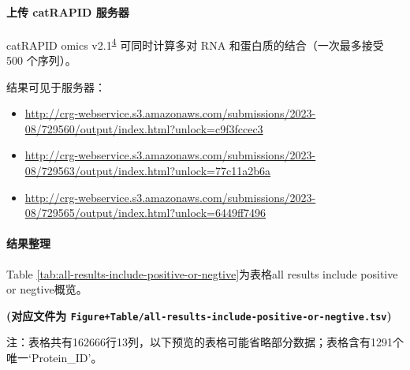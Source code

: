 \documentclass[
]{article}
\providecommand{\tightlist}{%
  \setlength{\itemsep}{0pt}\setlength{\parskip}{0pt}}
\begin{document}
\hypertarget{ux4e0aux4f20-catrapid-ux670dux52a1ux5668}{%
\paragraph{上传 catRAPID 服务器}\label{ux4e0aux4f20-catrapid-ux670dux52a1ux5668}}

catRAPID omics v2.1\textsuperscript{\protect\hyperlink{ref-ICatIRapidArmaos2021}{4}} 可同时计算多对 RNA 和蛋白质的结合（一次最多接受 500 个序列）。

结果可见于服务器：

\begin{itemize}
\tightlist
\item
  \url{http://crg-webservice.s3.amazonaws.com/submissions/2023-08/729560/output/index.html?unlock=c9f3fccec3}
\item
  \url{http://crg-webservice.s3.amazonaws.com/submissions/2023-08/729563/output/index.html?unlock=77c11a2b6a}
\item
  \url{http://crg-webservice.s3.amazonaws.com/submissions/2023-08/729565/output/index.html?unlock=6449ff7496}
\end{itemize}

\hypertarget{ux7ed3ux679cux6574ux7406}{%
\paragraph{结果整理}\label{ux7ed3ux679cux6574ux7406}}

Table \ref{tab:all-results-include-positive-or-negtive}为表格all results include positive or negtive概览。

\textbf{(对应文件为 \texttt{Figure+Table/all-results-include-positive-or-negtive.tsv})}

\begin{center}\begin{tcolorbox}[colback=gray!10, colframe=gray!50, width=0.9\linewidth, arc=1mm, boxrule=0.5pt]注：表格共有162666行13列，以下预览的表格可能省略部分数据；表格含有1291个唯一`Protein\_ID'。
\end{tcolorbox}
\end{center}
\end{document}
